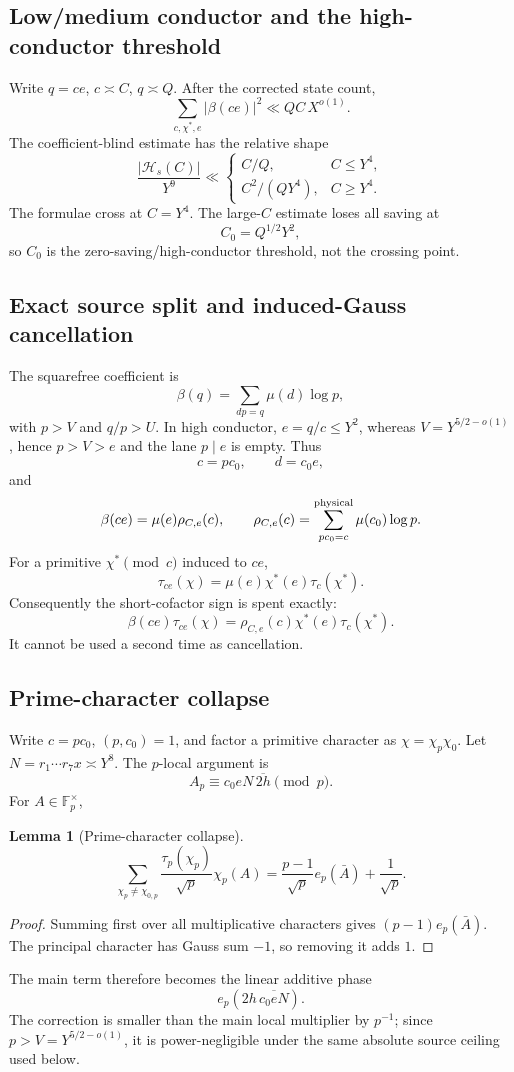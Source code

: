 \documentclass[11pt]{article}
\newtheorem{lemma}[lemma]{Lemma}
\theoremstyle{definition}
\newcommand{\1}{\mathbf 1}
\begin{document}
\subsection{Low/medium conductor and the high-conductor threshold}
Write $q=ce$, $c\asymp C$, $q\asymp Q$.  After the corrected state count,
\[
   \sum_{c,\chi^\ast,e}|\beta(ce)|^2\ll QC\,X^{o(1)}.
\]
The coefficient-blind estimate has the relative shape
\[
 \frac{|\mathcal H_s(C)|}{Y^9}
 \ll
 \begin{cases}
  C/Q,& C\le Y^4,\\
  C^2/(QY^4),& C\ge Y^4.
 \end{cases}
\]
The formulae cross at $C=Y^4$.  The large-$C$ estimate loses all saving at
\[
   C_0=Q^{1/2}Y^2,
\]
so $C_0$ is the zero-saving/high-conductor threshold, not the crossing point.

\subsection{Exact source split and induced-Gauss cancellation}
The squarefree coefficient is
\[
 \beta(q)=\sum_{dp=q}\mu(d)\log p,
\]
with $p>V$ and $q/p>U$.  In high conductor, $e=q/c\le Y^2$, whereas
$V=Y^{5/2-o(1)}$, hence $p>V>e$ and the lane $p\mid e$ is empty.  Thus
\[
   c=pc_0,\qquad d=c_0e,
\]
and
\begin{equation}
   \beta(ce)=\mu(e)\rho_{C,e}(c),
   \qquad
   \rho_{C,e}(c)=
   \sum_{pc_0=c}^{\rm physical}\mu(c_0)\log p.
   \label{eq:beta-C}
\end{equation}
For a primitive $\chi^\ast\pmod c$ induced to $ce$,
\begin{equation}
   \tau_{ce}(\chi)=\mu(e)\chi^\ast(e)\tau_c(\chi^\ast).
   \label{eq:induced-gauss2}
\end{equation}
Consequently the short-cofactor sign is spent exactly:
\[
   \beta(ce)\tau_{ce}(\chi)
   =\rho_{C,e}(c)\chi^\ast(e)\tau_c(\chi^\ast).
\]
It cannot be used a second time as cancellation.

\subsection{Prime-character collapse}
Write $c=pc_0$, $(p,c_0)=1$, and factor a primitive character as
$\chi=\chi_p\chi_0$.  Let
$N=r_1\cdots r_7x\asymp Y^8$.  The $p$-local argument is
\[
   A_p\equiv c_0eN\,\overline{2h}\pmod p.
\]
For $A\in\mathbb F_p^\times$,
\begin{lemma}[Prime-character collapse]
\label{lem:prime-collapse}
\[
 \sum_{\chi_p\ne\chi_{0,p}}
   \frac{\tau_p(\chi_p)}{\sqrt p}\chi_p(A)
 =\frac{p-1}{\sqrt p}e_p(\bar A)+\frac1{\sqrt p}.
\]
\end{lemma}
\begin{proof}
Summing first over all multiplicative characters gives
$(p-1)e_p(\bar A)$.  The principal character has Gauss sum $-1$, so removing
it adds $1$.
\end{proof}
The main term therefore becomes the linear additive phase
\[
   e_p\!\left(2h\,\overline{c_0eN}\right).
\]
The correction is smaller than the main local multiplier by $p^{-1}$; since
$p>V=Y^{5/2-o(1)}$, it is power-negligible under the same absolute source
ceiling used below.
\end{document}
